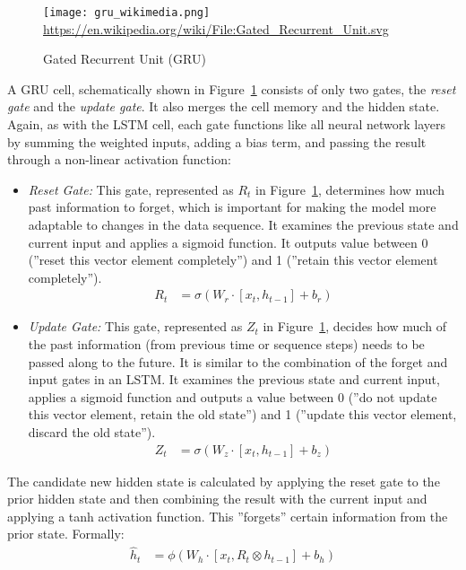 \begin{figure}
\centering

\texttt{[image: gru\_wikimedia.png]}
\scriptsize \url{https://en.wikipedia.org/wiki/File:Gated_Recurrent_Unit.svg} \normalsize
\caption{Gated Recurrent Unit (GRU)}
\label{fig:gru}
\end{figure}

A GRU cell, schematically shown in Figure~\ref{fig:gru} consists of only two gates, the \emph{reset gate} and the \emph{update gate}. It also merges the cell memory and the hidden state. Again, as with the LSTM cell, each gate functions like all neural network layers by summing the weighted inputs, adding a bias term, and passing the result through a non-linear activation function:

\begin{itemize}
\item \emph{Reset Gate:} This gate, represented as $R_t$ in Figure~\ref{fig:gru}, determines how much past information to forget, which is important for making the model more adaptable to changes in the data sequence. It examines the previous state and current input and applies a sigmoid function. It outputs  value between 0 (''reset this vector element completely'') and 1 (''retain this vector element completely'').
\begin{align}
R_t &= \sigma (W_r \cdot [x_t, h_{t-1}] + b_r) \label{eq:reset}
\end{align}
\item \emph{Update Gate:} This gate, represented as $Z_t$ in Figure~\ref{fig:gru}, decides how much of the past information (from previous time or sequence steps) needs to be passed along to the future. It is similar to the combination of the forget and input gates in an LSTM. It examines the previous state and current input, applies a sigmoid function and outputs a value between 0 (''do not update this vector element, retain the old state'') and 1 (''update this vector element, discard the old state''). 
\begin{align}
Z_t &= \sigma (W_z \cdot [x_t, h_{t-1}] + b_z) \label{eq:update}
\end{align}
\end{itemize}

The candidate new hidden state is calculated by applying the reset gate to the prior hidden state and then combining the result with the current input and applying a tanh activation function. This ''forgets'' certain information from the prior state. Formally:
\begin{align}
\hat{h}_t &= \phi (W_h \cdot [x_t, R_t \otimes h_{t-1}] + b_h) \label{eq:candidategru}
\end{align}

